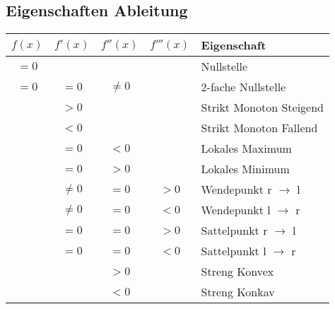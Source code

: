 \subsection{Eigenschaften Ableitung}
\begin{tabular}{c | c | c | c | l}
    $f(x)$            & $f'(x)$  & $f''(x)$ & $ f'''(x)$ & Eigenschaft\\\hline
    $= 0$             &          &          &            & Nullstelle\\\hline
    $= 0$             & $= 0$    & $\neq 0$ &            & $2$-fache Nullstelle\\\hline
                      & $> 0$    &          &            & Strikt Monoton Steigend\\\hline
                      & $< 0$    &          &            & Strikt Monoton Fallend\\\hline
                      & $= 0$    & $< 0$    &            & Lokales Maximum\\\hline
                      & $= 0$    & $> 0$    &            & Lokales Minimum\\\hline
                      & $\neq 0$ & $= 0$    & $> 0$      & Wendepunkt r $\to$ l\\\hline
                      & $\neq 0$ & $= 0$    & $< 0$      & Wendepunkt l $\to$ r\\\hline
                      & $= 0$    & $= 0$    & $> 0$      & Sattelpunkt r $\to$ l\\\hline
                      & $= 0$    & $= 0$    & $< 0$      & Sattelpunkt l $\to$ r\\\hline
                      &          & $> 0$    &            & Streng Konvex\\\hline
                      &          & $< 0$    &            & Streng Konkav\\\hline
\end{tabular}

